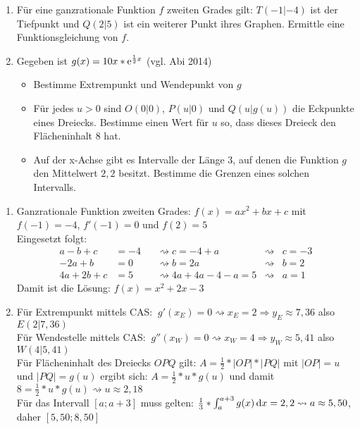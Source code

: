 \begin{enumerate}
	\item Für eine ganzrationale Funktion $f$ zweiten Grades gilt: $T(-1|-4)$ ist der Tiefpunkt und $Q(2|5)$ ist ein weiterer Punkt ihres Graphen. Ermittle eine Funktionsgleichung von $f$.
	\item Gegeben ist $g(x)=10x*\mathrm{e}^{\frac{1}{2}x}$ (vgl. Abi 2014)\cas\begin{itemize}
		\item Bestimme Extrempunkt und Wendepunkt von $g$
		\item Für jedes $u>0$ sind $O(0|0)$, $P(u|0)$ und $Q(u|g(u))$ die Eckpunkte eines Dreiecks. Bestimme einen Wert für $u$ so, dass dieses Dreieck den Flächeninhalt $8$ hat.
		\item Auf der x-Achse gibt es Intervalle der Länge 3, auf denen die Funktion $g$ den Mittelwert $2,2$ besitzt. Bestimme die Grenzen eines solchen Intervalls.
	\end{itemize}
\end{enumerate}

\begin{lsg}{}
\begin{enumerate}
	\item Ganzrationale Funktion zweiten Grades: $f(x)=ax^2+bx+c$ mit $f(-1)=-4$, $f'(-1)=0$ und $f(2)=5$\\
	Eingesetzt folgt:\begin{align*}
		a-b+c&=-4&& \rightsquigarrow c=-4+a&\rightsquigarrow &c=-3\\
		-2a+b&=0&&\rightsquigarrow b=2a &\rightsquigarrow &b=2\\
		4a+2b+c&=5&&\rightsquigarrow 4a+4a-4-a=5&\rightsquigarrow &a=1
	\end{align*}
Damit ist die Lösung: $f(x)=x^2+2x-3$
	\item Für Extrempunkt mittels CAS: $\ g'(x_E)=0\rightsquigarrow x_E=2\Rightarrow y_E\approx 7,36$ also $E(2|7,36)$\\
	Für Wendestelle mittels CAS: $\ g''(x_W)=0 \rightsquigarrow x_W=4 \Rightarrow y_W\approx 5,41$ also $W(4|5,41)$\\
	Für Flächeninhalt des Dreiecks $OPQ$ gilt: $A=\frac{1}{2}* |OP|*|PQ|$ mit $|OP|=u$ und $|PQ|=g(u)$ ergibt sich:
	$A=\frac{1}{2}*u*g(u)$ und damit $8=\frac{1}{2}*u*g(u) \rightsquigarrow u\approx 2,18$\\
	Für das Intervall $[a;a+3]$ muss gelten: $\frac{1}{3}*\int_a^{a+3} g(x) \,\mathrm{d} x =2,2\rightsquigarrow a \approx 5,50$, daher $[5,50;8,50]$


\end{enumerate}
\end{lsg}



